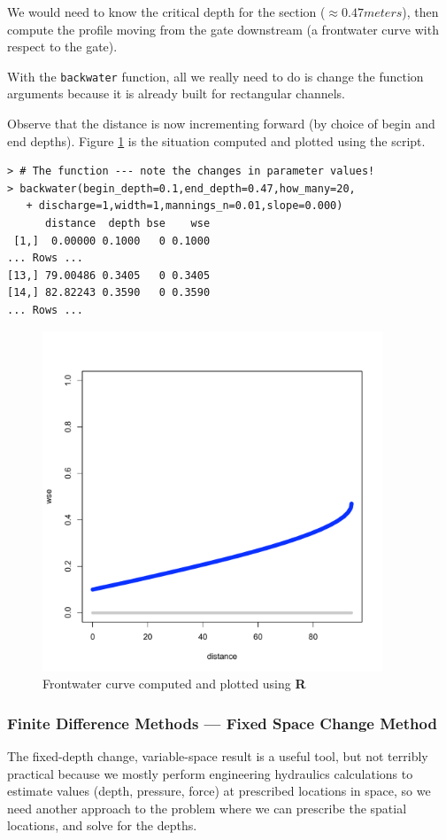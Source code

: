 We would need to know the critical depth for the section ($\approx 0.47 meters$), then compute the profile moving from the gate downstream (a frontwater curve with respect to the gate).  

With the \texttt{backwater} function, all we really need to do is change the function arguments because it is already built for rectangular channels.  

Observe that the distance is now incrementing forward (by choice of begin and end depths).  Figure \ref{fig:Rplot2} is the situation computed and plotted using the script.

\begin{lstlisting}[caption=R Console Output when script is run \\ , label=lst:frontwaterConsole]
> # The function --- note the changes in parameter values!
> backwater(begin_depth=0.1,end_depth=0.47,how_many=20,
   + discharge=1,width=1,mannings_n=0.01,slope=0.000)
      distance  depth bse    wse
 [1,]  0.00000 0.1000   0 0.1000
... Rows ...
[13,] 79.00486 0.3405   0 0.3405
[14,] 82.82243 0.3590   0 0.3590
... Rows ...
\end{lstlisting} 

\begin{figure}[h!] %
   \centering
   \includegraphics[width=4in]{Example2Rplot.pdf} 
   \caption{Frontwater curve computed and plotted using \textbf{R}}
   \label{fig:Rplot2}
\end{figure}
\newpage
\subsubsection{Finite Difference Methods --- Fixed Space Change Method}
The fixed-depth change, variable-space result is a useful tool, but not terribly practical because we mostly perform engineering hydraulics calculations to estimate values (depth, pressure, force) at prescribed locations in space, so we need another approach to the problem where we can prescribe the spatial locations, and solve for the depths.

